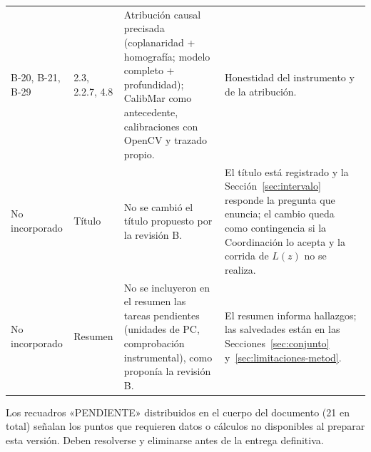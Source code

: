 \documentclass{report}
\newcommand{\thependcount}{21}
\begin{document}
\begin{longtable}{@{}p{1.6cm}p{2.0cm}p{6.0cm}p{5.0cm}@{}}
B-20, B-21, B-29 & 2.3, 2.2.7, 4.8 & Atribución causal precisada (coplanaridad + homografía; modelo completo + profundidad); CalibMar como antecedente, calibraciones con OpenCV y trazado propio. & Honestidad del instrumento y de la atribución. \\
No incorporado & Título & No se cambió el título propuesto por la revisión B. & El título está registrado y la Sección~\ref{sec:intervalo} responde la pregunta que enuncia; el cambio queda como contingencia si la Coordinación lo acepta y la corrida de $L(z)$ no se realiza. \\
No incorporado & Resumen & No se incluyeron en el resumen las tareas pendientes (unidades de PC, comprobación instrumental), como proponía la revisión B. & El resumen informa hallazgos; las salvedades están en las Secciones~\ref{sec:conjunto} y~\ref{sec:limitaciones-metod}. \\
\end{longtable}


Los recuadros «PENDIENTE» distribuidos en el cuerpo del documento (\thependcount{} en total) señalan los puntos que requieren datos o cálculos no disponibles al preparar esta versión. Deben resolverse y eliminarse antes de la entrega definitiva.
\end{document}
